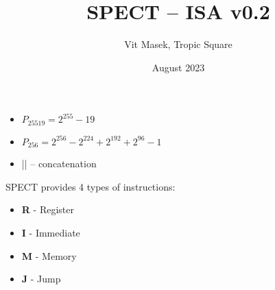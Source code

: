 \documentclass{tropic_design_spec}
\title{SPECT -- ISA v0.2}
\author{Vit Masek, Tropic Square}
\date{August 2023}
\begin{document}
\def \projectname {SPECT}
\def \documentname {ISA v0.2}
\def \versionnumber {0.1}

\maketitle

\newcommand{\tspar}{\par\vspace{0.5cm}}
\newcommand{\tsspc}{\vspace{0.5cm}}
\newcommand{\tsblank}{\hspace*{0.5cm}}
\newcommand{\bi}[1]{\textbf{\textit{#1}}}

\newcommand{\tsnlind}{\newline\tsblank}

\newcommand{\tsif}{\textbf{\textit{if }}}
\newcommand{\tsthen}{\textbf{\textit{then: }}}
\newcommand{\tselse}{\newline\textbf{\textit{else: }}}



\begin{itemize}
    \item{$P_{25519} = 2^{255} - 19$}
    \item{$P_{256} = 2^{256} - 2^{224} + 2^{192} + 2^{96} - 1$}
    \item{|| -- concatenation}
\end{itemize}



SPECT provides 4 types of instructions:
\begin{itemize}
    \item{\textbf{R} - Register}
    \item{\textbf{I} - Immediate}
    \item{\textbf{M} - Memory}
    \item{\textbf{J} - Jump}
\end{itemize}
\end{document}
